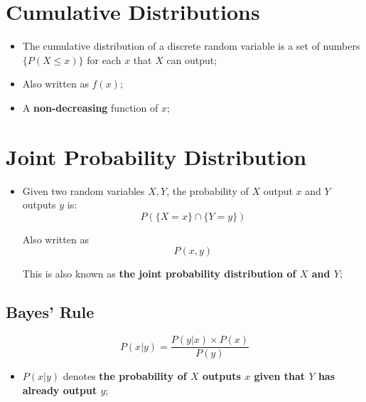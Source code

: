 \section{Cumulative Distributions}

  \begin{itemize}
    \item The cumulative distribution of a discrete random variable is a set of numbers $ \{ P \left( X \leq x \right) \} $ for each $ x $ that $ X $ can output;
    \item Also written as $ f \left( x \right) $;
    \item A \textbf{non-decreasing} function of $ x $;
  \end{itemize}

\section{Joint Probability Distribution}

  \begin{itemize}
    \item Given two random variables $ X, Y $, the probability of $ X $ output $ x $ and $ Y $ outputs $ y $ is:
    \begin{displaymath}
      P(\{ X = x \} \cap \{ Y = y \})
    \end{displaymath}

    Also written as 
    \begin{displaymath}
      P(x, y)
    \end{displaymath}
    
    This is also known as \textbf{the joint probability distribution of $ X $ and $ Y $};
  \end{itemize}
  
  \subsection{Bayes' Rule}
  
    \begin{equation}
      P \left( x|y \right) = \frac{ P \left( y|x \right) \times P \left( x \right) }{ P \left( y \right) }
    \end{equation}
    
    \begin{itemize}
      \item $ P \left( x|y \right) $ denotes \textbf{the probability of $ X $ outputs $ x $ given that $ Y $ has already output $ y $};
    \end{itemize}
  

